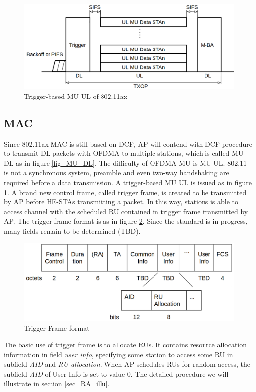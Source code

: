 \documentclass[journal]{IEEEtran}
\begin{document}
\begin{figure}[!t]
\includegraphics[scale=0.21]{./figure/fig_MU_UL.png}
\caption{Trigger-based MU UL of 802.11ax}
\label{fig_MU_UL}
\end{figure}


\subsection{MAC}
Since 802.11ax MAC is still based on DCF, AP will contend with DCF procedure to transmit DL packets with OFDMA to multiple stations, which is called MU DL as in figure \ref{fig_MU_DL}. 
The difficulty of OFDMA MU is MU UL. 
802.11 is not a synchronous system, preamble and even two-way handshaking are required before a data transmission. 
A trigger-based MU UL is issued as in figure \ref{fig_MU_UL}.
A brand new control frame, called trigger frame, is created to be transmitted by AP before HE-STAs transmitting a packet. 
In this way, stations is able to access channel with the scheduled RU contained in trigger frame transmitted by AP. 
The trigger frame format is as in figure \ref{fig_TF_format}. Since the standard is in progress, many fields remain to be determined (TBD). 

\begin{figure}[!ht]
\includegraphics[scale=0.2]{./figure/fig_tf_format.png}
\caption{Trigger Frame format}
\label{fig_TF_format}
\end{figure}

The basic use of trigger frame is to allocate RUs. It contains resource allocation information in field \textit{user info}, specifying some station to access some RU in subfield \textit{AID} and \textit{RU allocation}.  
When AP schedules RUs for random access, the subfield \textit{AID} of User Info is set to value 0. The detailed procedure we will illustrate in section \ref{sec_RA_illu}. 
\end{document}
